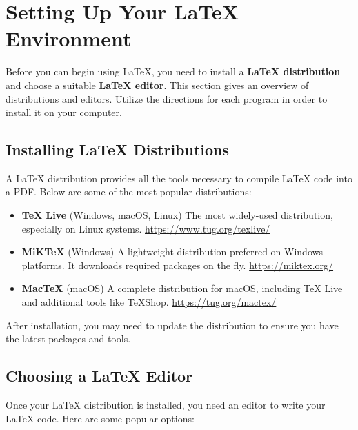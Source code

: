 \documentclass[12pt, oneside]{article}
\begin{document}
\section{Setting Up Your \LaTeX{} Environment}

Before you can begin using \LaTeX{}, you need to install a \textbf{LaTeX distribution} and choose a suitable \textbf{LaTeX editor}. This section gives an overview of distributions and editors. Utilize the directions for each program in order to install it on your computer.

\subsection{Installing \LaTeX{} Distributions}

A \LaTeX{} distribution provides all the tools necessary to compile \LaTeX{} code into a PDF. Below are some of the most popular distributions:

\begin{itemize}
    \item \textbf{TeX Live} (Windows, macOS, Linux)  
    The most widely-used distribution, especially on Linux systems.  
    \url{https://www.tug.org/texlive/}
    
    \item \textbf{MiKTeX} (Windows)  
    A lightweight distribution preferred on Windows platforms. It downloads required packages on the fly.  
    \url{https://miktex.org/}
    
    \item \textbf{MacTeX} (macOS)  
    A complete distribution for macOS, including TeX Live and additional tools like TeXShop.  
    \url{https://tug.org/mactex/}
\end{itemize}

After installation, you may need to update the distribution to ensure you have the latest packages and tools.

\subsection{Choosing a \LaTeX{} Editor}

Once your \LaTeX{} distribution is installed, you need an editor to write your \LaTeX{} code. Here are some popular options:
\end{document}
